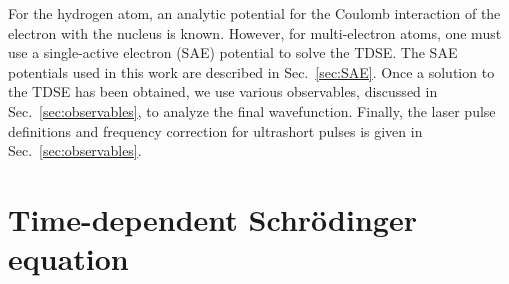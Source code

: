 For the hydrogen atom, an analytic potential for the Coulomb interaction of the electron with the nucleus is known. However, for multi-electron atoms, one must use a single-active electron (SAE) potential to solve the TDSE. The SAE potentials used in this work are described in Sec.~\ref{sec:SAE}. Once a solution to the TDSE has been obtained, we use various observables, discussed in Sec.~\ref{sec:observables}, to analyze the final wavefunction. Finally, the laser pulse definitions and frequency correction for ultrashort pulses is given in Sec.~\ref{sec:observables}.

\section{Time-dependent Schr\"odinger equation}
\label{sec:TDSE}

